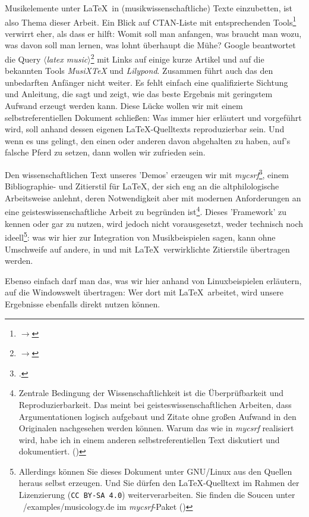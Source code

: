 Musikelemente unter \LaTeX\ in (musikwissenschaftliche) Texte einzubetten, ist
also Thema dieser Arbeit. Ein Blick auf CTAN-Liste mit entsprechenden
Tools\footnote{$\rightarrow$ }
verwirrt eher, als dass er hilft: Womit soll man anfangen, was braucht man wozu,
was davon soll man lernen, was lohnt überhaupt die Mühe? Google beantwortet die
Query $\langle$\emph{latex music}$\rangle$\footnote{$\rightarrow$
} mit Links auf einige kurze
Artikel und auf die bekannten Tools \emph{MusiX\TeX} und \emph{Lilypond}.
Zusammen führt auch das den unbedarften Anfänger nicht weiter. Es fehlt einfach
eine qualifizierte Sichtung und Anleitung, die sagt und zeigt, wie das beste
Ergebnis mit geringstem Aufwand erzeugt werden kann.  Diese Lücke wollen wir mit
einem selbstreferentiellen Dokument schließen: Was immer hier erläutert und
vorgeführt wird, soll anhand dessen eigenen \LaTeX-Quelltexts reproduzierbar
sein. Und wenn es uns gelingt, den einen oder anderen davon abgehalten zu haben,
auf's falsche Pferd zu setzen, dann wollen wir zufrieden sein.

Den wissenschaftlichen Text unseres 'Demos' erzeugen wir mit
\emph{mycsrf}\footcite[vgl.][\nopage wp]{Reincke2018a}, einem Bibliographie- und
Zitierstil für \LaTeX, der sich eng an die altphilologische Arbeitsweise
anlehnt, deren Notwendigkeit aber mit modernen Anforderungen an eine
geisteswissenschaftliche Arbeit zu begründen ist\footnote{Zentrale Bedingung der
Wissenschaftlichkeit ist die Überprüfbarkeit und Reproduzierbarkeit. Das meint
bei geisteswissenschaftlichen Arbeiten, dass Argumentationen logisch aufgebaut
und Zitate ohne großen Aufwand in den Originalen nachgesehen werden können.
Warum das wie in \emph{mycsrf} realisiert wird, habe ich in einem anderen
selbstreferentiellen Text diskutiert und dokumentiert. (\cite[Vgl.
dazu][1ff]{Reincke2018b})}. Dieses 'Framework' zu kennen oder gar zu nutzen,
wird jedoch nicht vorausgesetzt, weder technisch noch ideell\footnote{Allerdings
können Sie dieses Dokument unter GNU/Linux aus den Quellen heraus selbst
erzeugen. Und Sie dürfen den \LaTeX-Quelltext im Rahmen der Lizenzierung
(\texttt{CC BY-SA 4.0}) weiterverarbeiten. Sie finden die Soucen unter
~/examples/musicology.de im \emph{mycsrf}-Paket (\cite[Vgl. dazu][\nopage
wp]{Reincke2019a})}: was wir hier zur Integration von
Musikbeispielen sagen, kann ohne Umschweife auf andere, in und mit \LaTeX\
verwirklichte Zitierstile übertragen werden.

Ebenso einfach darf man das, was wir hier anhand von Linuxbeispielen erläutern,
auf die Windowswelt übertragen: Wer dort mit \LaTeX\ arbeitet, wird unsere
Ergebnisse ebenfalls direkt nutzen können.

